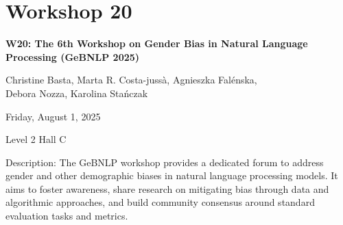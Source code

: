 \clearpage


\section[W20: The 6th Workshop on Gender Bias in Natural Language Processing (GeBNLP 2025)]{Workshop 20}
\label{workshop_20}

\begin{center}
    {\Large \textbf{W20: The 6th Workshop on Gender Bias in Natural Language Processing (GeBNLP 2025)}}\\
    
 \vspace{5mm}

Christine Basta, Marta R. Costa-jussà, Agnieszka Falénska, \\
Debora Nozza, Karolina Stańczak\\

 \vspace{5mm}

    Friday, August 1, 2025
    
 Level 2 Hall C
\end{center}

Description: The GeBNLP workshop provides a dedicated forum to address gender and other demographic biases in natural language processing models. It aims to foster awareness, share research on mitigating bias through data and algorithmic approaches, and build community consensus around standard evaluation tasks and metrics.

